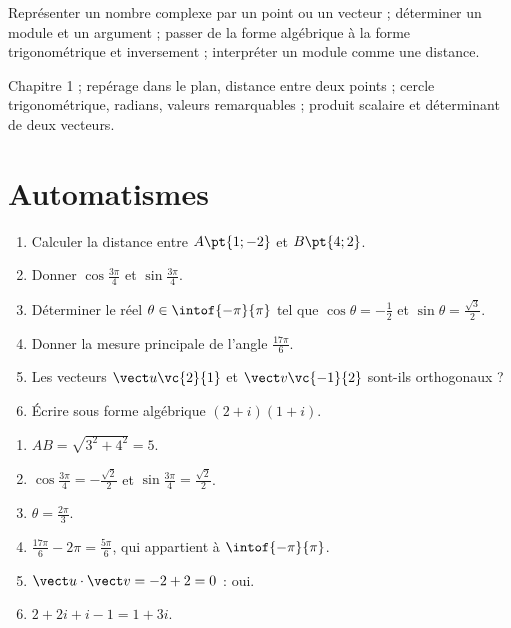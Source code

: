 
\begin{objectives}
Représenter un nombre complexe par un point ou un vecteur ; déterminer un module et un argument ; passer de la forme algébrique à la forme trigonométrique et inversement ; interpréter un module comme une distance.
\end{objectives}
\begin{prerequisites}
Chapitre 1 ; repérage dans le plan, distance entre deux points ; cercle trigonométrique, radians, valeurs remarquables ; produit scalaire et déterminant de deux vecteurs.
\end{prerequisites}

\section{Automatismes}
\begin{fluency}
\begin{enumerate}
\item Calculer la distance entre $A\pt{1;-2}$ et $B\pt{4;2}$.
\item Donner $\cos\frac{3\pi}{4}$ et $\sin\frac{3\pi}{4}$.
\item Déterminer le réel $\theta\in\intof{-\pi}{\pi}$ tel que $\cos\theta=-\frac12$ et $\sin\theta=\frac{\sqrt3}2$.
\item Donner la mesure principale de l'angle $\frac{17\pi}{6}$.
\item Les vecteurs $\vect u\vc{2}{1}$ et $\vect v\vc{-1}{2}$ sont-ils orthogonaux ?
\item Écrire sous forme algébrique $(2+i)(1+i)$.
\end{enumerate}
\end{fluency}
\begin{solution}[Automatismes]
\begin{enumerate}
\item $AB=\sqrt{3^2+4^2}=5$.
\item $\cos\frac{3\pi}{4}=-\frac{\sqrt2}2$ et $\sin\frac{3\pi}{4}=\frac{\sqrt2}2$.
\item $\theta=\frac{2\pi}{3}$.
\item $\frac{17\pi}{6}-2\pi=\frac{5\pi}{6}$, qui appartient à $\intof{-\pi}{\pi}$.
\item $\vect u\cdot\vect v=-2+2=0$ : oui.
\item $2+2i+i-1=1+3i$.
\end{enumerate}
\end{solution}


